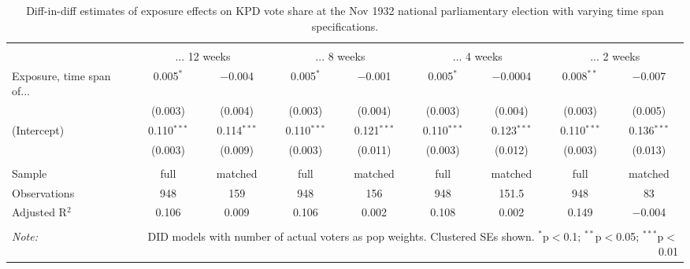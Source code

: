 
\begin{table}[!htbp] \centering 
  \caption{Diff-in-diff estimates of exposure effects on KPD vote share at the Nov 1932 national parliamentary election with varying time span specifications.\vspace{-.25cm}} 
  \label{tab:nsdap-voteshare-kpd-timespan-dd-1932-2} 
\scriptsize 
\begin{tabular}{@{\extracolsep{5pt}}lcccccccc} 
\\[-1.8ex]\hline 
\hline \\[-1.8ex] 
 & \multicolumn{2}{c}{... 12 weeks} & \multicolumn{2}{c}{... 8 weeks} & \multicolumn{2}{c}{... 4 weeks} & \multicolumn{2}{c}{... 2 weeks} \\ 
 \cmidrule(r){2-3}\cmidrule(r){4-5}\cmidrule(r){6-7}\cmidrule(r){8-9}Exposure, time span of... & 0.005$^{*}$ & $-$0.004 & 0.005$^{*}$ & $-$0.001 & 0.005$^{*}$ & $-$0.0004 & 0.008$^{**}$ & $-$0.007 \\ 
  & (0.003) & (0.004) & (0.003) & (0.004) & (0.003) & (0.004) & (0.003) & (0.005) \\ 
  (Intercept) & 0.110$^{***}$ & 0.114$^{***}$ & 0.110$^{***}$ & 0.121$^{***}$ & 0.110$^{***}$ & 0.123$^{***}$ & 0.110$^{***}$ & 0.136$^{***}$ \\ 
  & (0.003) & (0.009) & (0.003) & (0.011) & (0.003) & (0.012) & (0.003) & (0.013) \\ 
 \hline \\[-1.8ex] 
Sample & full & matched & full & matched & full & matched & full & matched \\ 
Observations & 948 & 159 & 948 & 156 & 948 & 151.5 & 948 & 83 \\ 
Adjusted R$^{2}$ & 0.106 & 0.009 & 0.106 & 0.002 & 0.108 & 0.002 & 0.149 & $-$0.004 \\ 
\hline 
\hline \\[-1.8ex] 
\textit{Note:}  & \multicolumn{8}{r}{DID models with number of actual voters as pop weights. Clustered SEs shown. $^{*}$p$<$0.1; $^{**}$p$<$0.05; $^{***}$p$<$0.01} \\ 
\end{tabular} 
\end{table} 
